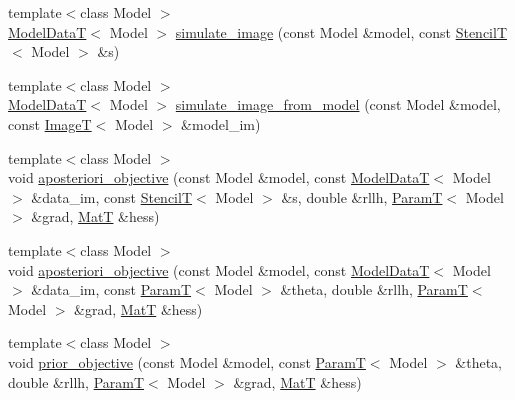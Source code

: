 \begin{DoxyCompactItemize}
\item 
{\footnotesize template$<$class Model $>$ }\\\hyperlink{namespacemappel_a97f050df953605381ae9c901c3b125f1}{Model\+DataT}$<$ Model $>$ \hyperlink{namespacemappel_1_1methods_a15b2a2c71ce10d72ab4a0d15404f39a9}{simulate\+\_\+image} (const Model \&model, const \hyperlink{namespacemappel_a3a06598240007876f8c4bf834ad86197}{StencilT}$<$ Model $>$ \&s)
\item 
{\footnotesize template$<$class Model $>$ }\\\hyperlink{namespacemappel_a97f050df953605381ae9c901c3b125f1}{Model\+DataT}$<$ Model $>$ \hyperlink{namespacemappel_1_1methods_a4aea528c97512ff11355e67fbb55b9bd}{simulate\+\_\+image\+\_\+from\+\_\+model} (const Model \&model, const \hyperlink{namespacemappel_a14658186b77757f3c35a69cb1be6cf4b}{ImageT}$<$ Model $>$ \&model\+\_\+im)
\item 
{\footnotesize template$<$class Model $>$ }\\void \hyperlink{namespacemappel_1_1methods_a5227b7c0f1c45c27cbebfcafefcab72b}{aposteriori\+\_\+objective} (const Model \&model, const \hyperlink{namespacemappel_a97f050df953605381ae9c901c3b125f1}{Model\+DataT}$<$ Model $>$ \&data\+\_\+im, const \hyperlink{namespacemappel_a3a06598240007876f8c4bf834ad86197}{StencilT}$<$ Model $>$ \&s, double \&rllh, \hyperlink{namespacemappel_a667925cb0d6c0e49f2f035cc5a9a6857}{ParamT}$<$ Model $>$ \&grad, \hyperlink{namespacemappel_a7091ab87c528041f7e2027195fad8915}{MatT} \&hess)
\item 
{\footnotesize template$<$class Model $>$ }\\void \hyperlink{namespacemappel_1_1methods_a3b0e13b783d21c08ba063a210b0a344b}{aposteriori\+\_\+objective} (const Model \&model, const \hyperlink{namespacemappel_a97f050df953605381ae9c901c3b125f1}{Model\+DataT}$<$ Model $>$ \&data\+\_\+im, const \hyperlink{namespacemappel_a667925cb0d6c0e49f2f035cc5a9a6857}{ParamT}$<$ Model $>$ \&theta, double \&rllh, \hyperlink{namespacemappel_a667925cb0d6c0e49f2f035cc5a9a6857}{ParamT}$<$ Model $>$ \&grad, \hyperlink{namespacemappel_a7091ab87c528041f7e2027195fad8915}{MatT} \&hess)
\item 
{\footnotesize template$<$class Model $>$ }\\void \hyperlink{namespacemappel_1_1methods_a275f2b0364c48bfc7e6f88e866d593bd}{prior\+\_\+objective} (const Model \&model, const \hyperlink{namespacemappel_a667925cb0d6c0e49f2f035cc5a9a6857}{ParamT}$<$ Model $>$ \&theta, double \&rllh, \hyperlink{namespacemappel_a667925cb0d6c0e49f2f035cc5a9a6857}{ParamT}$<$ Model $>$ \&grad, \hyperlink{namespacemappel_a7091ab87c528041f7e2027195fad8915}{MatT} \&hess)

\end{DoxyCompactItemize}
